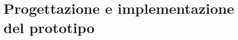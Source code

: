 \documentclass[12pt,a4paper,openright,twoside]{book}
\begin{document}
\chapter{Progettazione e implementazione del prototipo}
\end{document}
